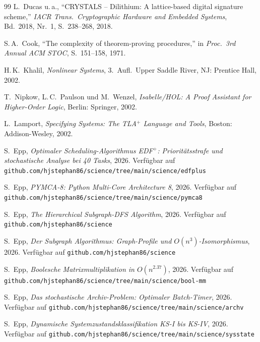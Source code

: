 ﻿\documentclass[a4paper,12pt]{scrreprt}
\theoremstyle{definition}
\begin{document}
\begin{thebibliography}{99}
		L.\ Ducas u.\,a.,
		``CRYSTALS -- Dilithium: A lattice-based digital signature scheme,''
		\textit{IACR Trans.\ Cryptographic Hardware and Embedded Systems},
		Bd.~2018, Nr.~1, S.~238--268, 2018.
		
		S.\,A.\ Cook,
		``The complexity of theorem-proving procedures,''
		in \textit{Proc.\ 3rd Annual ACM STOC}, S.~151--158, 1971.
		
		H.\,K.\ Khalil,
		\textit{Nonlinear Systems}, 3.~Aufl.\ Upper Saddle River, NJ:
		Prentice Hall, 2002.
		
		T.\ Nipkow, L.\,C.\ Paulson und M.\ Wenzel,
		\textit{Isabelle/HOL: A Proof Assistant for Higher-Order Logic},
		Berlin: Springer, 2002.
		
		L.\ Lamport,
		\textit{Specifying Systems: The TLA$^+$ Language and Tools},
		Boston: Addison-Wesley, 2002.
		
		S.\ Epp,
		\textit{Optimaler Scheduling-Algorithmus EDF$^+$: Prioritätsstrafe und
		stochastische Analyse bei 40 Tasks}, 2026. Verfügbar auf
		\texttt{github.com/hjstephan86/science/tree/main/science/edfplus}
		
		S.\ Epp,
		\textit{PYMCA-8: Python Multi-Core Architecture 8}, 2026. Verfügbar auf
		\texttt{github.com/hjstephan86/science/tree/main/science/pymca8}
		
		S.\ Epp,
		\textit{The Hierarchical Subgraph-DFS Algorithm}, 2026. Verfügbar auf
		\texttt{github.com/hjstephan86/science}
		
		S.\ Epp,
		\textit{Der Subgraph Algorithmus: Graph-Profile und $O(n^3)$-Isomorphismus}, 2026. Verfügbar auf \texttt{github.com/hjstephan86/science}
		
		S.\ Epp,
		\textit{Boolesche Matrixmultiplikation in $O(n^{2.37})$}, 2026. Verfügbar auf \texttt{github.com/hjstephan86/science/tree/main/science/bool-mm}
		
		S.\ Epp,
		\textit{Das stochastische Archiv-Problem: Optimaler Batch-Timer}, 2026. Verfügbar auf
		\texttt{github.com/hjstephan86/science/tree/main/science/archv}
		
		S.\ Epp,
		\textit{Dynamische Systemzustandsklassifikation KS-I bis KS-IV}, 2026. Verfügbar auf
		\texttt{github.com/hjstephan86/science/tree/main/science/sysstate}
		

\end{thebibliography}
\end{document}
